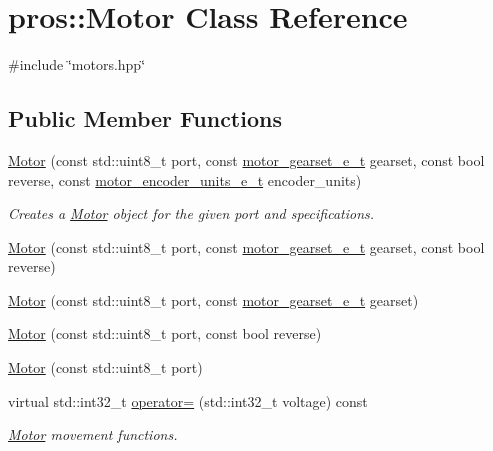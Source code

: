 \hypertarget{classpros_1_1Motor}{}\section{pros\+:\+:Motor Class Reference}
\label{classpros_1_1Motor}


{\ttfamily \#include \char`\"{}motors.\+hpp\char`\"{}}

\subsection*{Public Member Functions}
\begin{DoxyCompactItemize}
\item 
\hyperlink{classpros_1_1Motor_a5be9a41f9877208c887d5e2c081bc72e}{Motor} (const std\+::uint8\+\_\+t port, const \hyperlink{motors_8h_aa2f1c305c998abc3bf8dd1f76fa4da8b}{motor\+\_\+gearset\+\_\+e\+\_\+t} gearset, const bool reverse, const \hyperlink{motors_8h_a6677ba23760c558fd8b7b4e1e00a6123}{motor\+\_\+encoder\+\_\+units\+\_\+e\+\_\+t} encoder\+\_\+units)
\begin{DoxyCompactList}\small\item\em Creates a \hyperlink{classpros_1_1Motor}{Motor} object for the given port and specifications. \end{DoxyCompactList}\item 
\hyperlink{classpros_1_1Motor_a512050b652bf3034a21da12bf2b663ac}{Motor} (const std\+::uint8\+\_\+t port, const \hyperlink{motors_8h_aa2f1c305c998abc3bf8dd1f76fa4da8b}{motor\+\_\+gearset\+\_\+e\+\_\+t} gearset, const bool reverse)
\item 
\hyperlink{classpros_1_1Motor_aff27ad42b72a59c35e36a665bcd763a6}{Motor} (const std\+::uint8\+\_\+t port, const \hyperlink{motors_8h_aa2f1c305c998abc3bf8dd1f76fa4da8b}{motor\+\_\+gearset\+\_\+e\+\_\+t} gearset)
\item 
\hyperlink{classpros_1_1Motor_a822e0023951996ca7eff13ffe9cf953d}{Motor} (const std\+::uint8\+\_\+t port, const bool reverse)
\item 
\hyperlink{classpros_1_1Motor_a767b4ad39251b8e8411fae17a35b24ba}{Motor} (const std\+::uint8\+\_\+t port)
\item 
virtual std\+::int32\+\_\+t \hyperlink{classpros_1_1Motor_a4cf8a9518eb6cd268d27151f0df7fd38}{operator=} (std\+::int32\+\_\+t voltage) const
\begin{DoxyCompactList}\small\item\em \hyperlink{classpros_1_1Motor}{Motor} movement functions. \end{DoxyCompactList}\item 

\end{DoxyCompactItemize}

